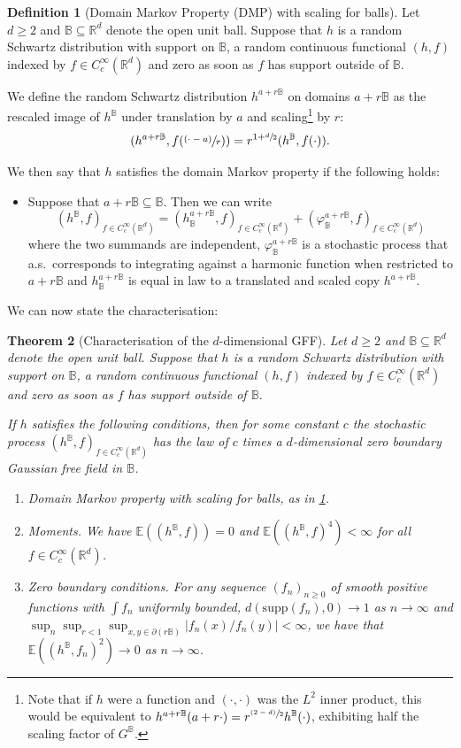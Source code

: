 \documentclass[10pt]{amsart}
\newcommand{\psfrac}[2]{\sfrac{(#1)}{#2}}
\newtheorem{theorem}{Theorem}
\theoremstyle{definition}
\newtheorem{definition}[theorem]{Definition}
\newcommand{\R}{\mathbb{R}}
\newcommand{\E}{\mathbb{E}}
\newcommand{\B}{\mathbb{B}}\let\D\B\let\Ub\B
\begin{document}
\begin{definition}[Domain Markov Property (DMP) with scaling for balls]\label{def:dmp}
Let $d \geq 2$ and $\D \subseteq \R^d$ denote the open unit ball. Suppose that $h$ is a random Schwartz distribution with support on $\D$, \ie a random continuous functional $(h,f)$ indexed by $f \in C_c^\infty(\R^d)$ and zero as soon as $f$ has support outside of $\D$.

We define the random Schwartz distribution $h^{a+r\D}$ on domains $a + r\D$ as the rescaled image of $h^\D$ under translation by $a$ and scaling\footnote{Note that if $h$ were a function and $(
\cdot,
\cdot)$ was the $L^2$ inner product, this would be equivalent to $h^{a+r\B}(a+r\cdot)=r^{\psfrac{2-d}{2}}h^\B(\cdot)$, exhibiting half the scaling factor of $G^\B$.} by $r$:
\[
(h^{a+r\D},f(\psfrac{\cdot - a}{r}))=r^{1+\sfrac{d}{2}}(h^\D,f(\cdot)).
\]

We then say that $h$ satisfies the domain Markov property if the following holds:
\begin{itemize}
\item Suppose that $a+r\D \subseteq \D$. Then
we can write
\[
(h^\D,f)_{f\in C_c^\infty(\R^d)}=(h^{a+r\D}_\D,f)_{f\in C_c^\infty(\R^d)}+(\varphi^{a+r\D}_\D,f)_{f\in C_c^\infty(\R^d)}
\]
where the two summands are independent, $\varphi_\D^{a+r\D}$ is a stochastic process that a.s.\ corresponds to integrating against a harmonic function when restricted to $a+r\D$ and
$h_\B^{a+r\B}$ is equal in law to a translated and scaled copy $h^{a+r\D}$.
\end{itemize}
\end{definition}

We can now state the characterisation:


\begin{theorem}[Characterisation of the $d$-dimensional GFF]\label{thm_main}
Let $d \geq 2$ and $\D \subseteq \R^d$ denote the open unit ball. Suppose that $h$ is a random Schwartz distribution with support on $\D$, \ie a random continuous functional $(h,f)$ indexed by $f \in C_c^\infty(\R^d)$ and zero as soon as $f$ has support outside of $\D$.

If $h$ satisfies the following conditions, then for some constant $c$ the stochastic process $(h^{\D},f)_{f\in C_c^\infty(\R^d)}$ has the law of $c$ times a $d$-dimensional zero boundary Gaussian free field in $\D$.
\begin{enumerate}
\item\label{dmp} \emph{Domain Markov property with scaling for balls}, as in \cref{def:dmp}.
\item\label{mom} \emph{Moments}. We have $\E((h^\D,f))=0$ and $\E((h^\D,f)^4)<\infty$ for all $f\in
C_c^\infty(\R^d)$.
\item\label{zbc} \emph{Zero boundary conditions}. For any sequence $(f_n)_{n\ge 0}$ of smooth positive functions with $\int f_n$ uniformly bounded, $d(\mathrm{supp}(f_n),0)\to 1$ as $n\to \infty$ and $\sup_n \sup_{r<1}\sup_{x,y\in \partial(r\B)} |f_n(x)/f_n(y)|\!<\!\infty$, we have that $\E((h^\B,f_n)^2)\!\to\! 0$ as $n\!\to\! \infty$.
\end{enumerate}
\end{theorem}
\end{document}
